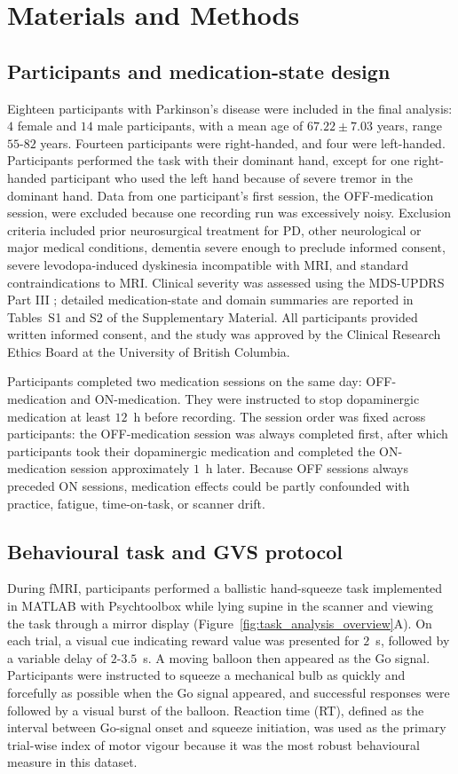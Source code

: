\documentclass[utf8]{FrontiersinHarvard}
\begin{document}
\section{Materials and Methods}

\subsection{Participants and medication-state design}
Eighteen participants with Parkinson's disease were included in the final analysis: \(4\) female and \(14\) male participants, with a mean age of \(67.22 \pm 7.03\) years, range \(55\)-\(82\) years. Fourteen participants were right-handed, and four were left-handed. Participants performed the task with their dominant hand, except for one right-handed participant who used the left hand because of severe tremor in the dominant hand. Data from one participant's first session, the OFF-medication session, were excluded because one recording run was excessively noisy. Exclusion criteria included prior neurosurgical treatment for PD, other neurological or major medical conditions, dementia severe enough to preclude informed consent, severe levodopa-induced dyskinesia incompatible with MRI, and standard contraindications to MRI. Clinical severity was assessed using the MDS-UPDRS Part III \citep{goetz2008movement}; detailed medication-state and domain summaries are reported in Tables~S1 and S2 of the Supplementary Material. All participants provided written informed consent, and the study was approved by the Clinical Research Ethics Board at the University of British Columbia.

Participants completed two medication sessions on the same day: OFF-medication and ON-medication. They were instructed to stop dopaminergic medication at least \(12\)~h before recording. The session order was fixed across participants: the OFF-medication session was always completed first, after which participants took their dopaminergic medication and completed the ON-medication session approximately \(1\)~h later. Because OFF sessions always preceded ON sessions, medication effects could be partly confounded with practice, fatigue, time-on-task, or scanner drift.

\subsection{Behavioural task and GVS protocol}
During fMRI, participants performed a ballistic hand-squeeze task implemented in MATLAB with Psychtoolbox \citep{brainard1997psychophysics} while lying supine in the scanner and viewing the task through a mirror display (Figure~\ref{fig:task_analysis_overview}A). On each trial, a visual cue indicating reward value was presented for \(2\)~s, followed by a variable delay of \(2\)-\(3.5\)~s. A moving balloon then appeared as the Go signal. Participants were instructed to squeeze a mechanical bulb as quickly and forcefully as possible when the Go signal appeared, and successful responses were followed by a visual burst of the balloon. Reaction time (RT), defined as the interval between Go-signal onset and squeeze initiation, was used as the primary trial-wise index of motor vigour because it was the most robust behavioural measure in this dataset.
\end{document}
